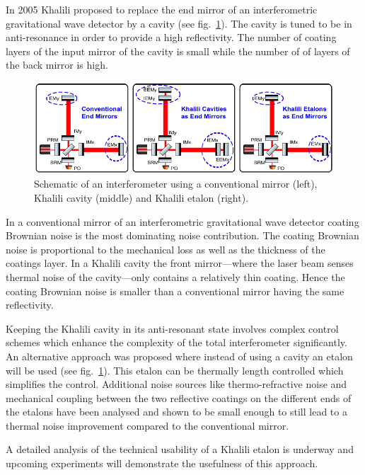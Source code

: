 In 2005 Khalili proposed to replace the end mirror of an interferometric gravitational wave detector by a cavity (see fig.~\ref{fig:khalili_RD}). The cavity is tuned to be in anti-resonance in order to provide a high reflectivity. The number of coating layers of the input mirror of the cavity is small while the number of of layers of the back mirror is high. 

\begin{figure}[H]
\begin{center}
\includegraphics [width =0.85\linewidth]{./Sec_Optics/khalili.png}
\caption {Schematic of an interferometer using a conventional mirror (left), Khalili cavity (middle) and Khalili etalon (right).}\label{fig:khalili_RD}
\end{center}
\end{figure}

In a conventional mirror of an interferometric gravitational wave detector coating Brownian noise is the most dominating noise contribution. The coating Brownian noise is proportional to the mechanical loss as well as the thickness of the coatings layer. In a Khalili cavity the front mirror---where the laser beam senses thermal noise of the cavity---only contains a relatively thin coating. Hence the coating Brownian noise is smaller than a conventional mirror having the same reflectivity.

Keeping the Khalili cavity in its anti-resonant state involves complex control schemes which enhance the complexity of the total interferometer significantly. An alternative approach was proposed \cite{Somiya2011} where instead of using a cavity an etalon will be used (see fig.~\ref{fig:khalili_RD}). This etalon can be thermally length controlled which simplifies the control. Additional noise sources like thermo-refractive noise and mechanical coupling between the two reflective coatings on the different ends of the etalons have been analysed and shown to be small enough to still lead to a thermal noise improvement compared to the conventional mirror.

A detailed analysis of the technical usability of a Khalili etalon is underway and upcoming experiments will demonstrate the usefulness of this approach.

